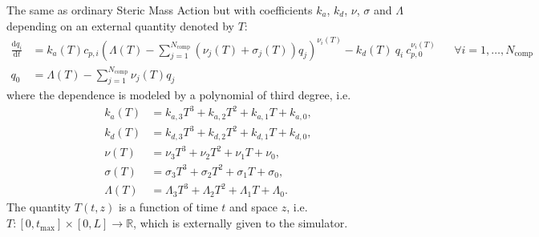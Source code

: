The same as ordinary Steric Mass Action but with coefficients $k_a$, $k_d$, $\nu$, $\sigma$ and $\Lambda$ depending on an external quantity denoted by $T$:
\begin{align*}
  \frac{\mathrm{d} q_i}{\mathrm{d} t} &= k_a(T) c_{p,i}\left( \Lambda(T) - \sum_{j=1}^{N_{\text{comp}}} \left( \nu_j(T) + \sigma_j(T) \right) q_j \right)^{\nu_i(T)} - k_d(T)\: q_i\: c_{p,0}^{\nu_i(T)} && \forall i = 1, \dots, N_{\text{comp}} \\
  q_0 &= \Lambda(T) - \sum_{j=1}^{N_{\text{comp}}} \nu_j(T) q_j
\end{align*}
where the dependence is modeled by a polynomial of third degree, i.e.
\begin{align*}
  k_a(T) &= k_{a,3} T^3 + k_{a,2} T^2 + k_{a,1} T + k_{a,0}, \\
  k_d(T) &= k_{d,3} T^3 + k_{d,2} T^2 + k_{d,1} T + k_{d,0}, \\
  \nu(T) &= \nu_3 T^3 + \nu_2 T^2 + \nu_1 T + \nu_0, \\
  \sigma(T) &= \sigma_3 T^3 + \sigma_2 T^2 + \sigma_1 T + \sigma_0, \\
  \Lambda(T) &= \Lambda_3 T^3 + \Lambda_2 T^2 + \Lambda_1 T + \Lambda_0.
\end{align*}
The quantity $T(t, z)$ is a function of time $t$ and space $z$, i.e.\ $T\colon [0, t_{\text{max}}] \times [0, L] \rightarrow \mathds{R}$, which is externally given to the simulator.

